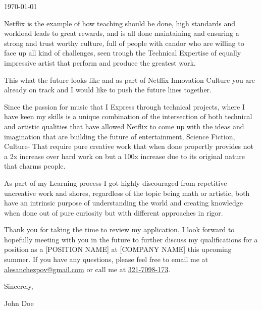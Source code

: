 \documentclass{ExpressiveCoverLetter}
\begin{document}
\coverletterheader[
    firstname=Alejandro,
    lastname=Sánchez,
    email=alesanchezpov@gmail.com,
    phone= +57321-7098-173,
    linkedin=alejandrosanchezpoveda,
    github=Asperjasp,
    city=Bogotá D.C,
    state=Colombia
]

\vspace{0.25in}
\today
\vspace{0.15in}


Netflix is the example of how teaching should be done, high standards and workload leads to great rewards, and is all done maintaining and ensuring a strong and trust worthy culture, full of people with candor who are willing to face up all kind of challenges, 
seen trough the Technical Expertise of equally impressive artist that perform and produce the greatest work.

This what the future looks like and as part of Netflix Innovation Culture you are already on track and I would like to push the future lines together.

Since the passion for music that I Express through technical projects, where I have keen my skills is a unique combination of the intersection of both technical and artistic qualities that have  allowed Netflix
to come up with the ideas and imagination that are building the future of entertainment, Science Fiction, Culture- That require pure creative work that when done propertly provides not a 2x increase over hard work on but a 100x increase due to its original nature that charms people. 

As part of my Learning process I got highly discouraged from repetitive uncreative work and shores, regardless of the topic being math or artistic, both have an intrinsic purpose of understanding the world and creating knowledge when done out of pure curiosity but with different approaches in rigor.

Thank you for taking the time to review my application. I look forward
to hopefully meeting with you in the future to further discuss my
qualifications for a position as a [POSITION NAME] at [COMPANY NAME]
this upcoming summer. If you have any questions, please feel free to
email me at \href{mailto:alesanchezpov@gmail.com}{alesanchezpov@gmail.com} or
call me at \href{tel:+57-321-7098-173}{321-7098-173}.

Sincerely,

\vspace{.15in}

John Doe
\end{document}
